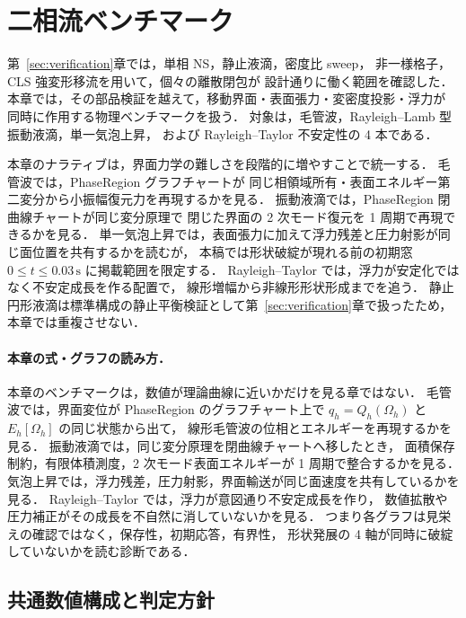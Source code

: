 %
%

\section{二相流ベンチマーク}
\label{sec:validation}
\label{sec:benchmarks}

第~\ref{sec:verification}章では，単相 NS，静止液滴，密度比 sweep，
非一様格子，CLS 強変形移流を用いて，個々の離散閉包が
設計通りに働く範囲を確認した．
本章では，その部品検証を越えて，移動界面・表面張力・変密度投影・浮力が
同時に作用する物理ベンチマークを扱う．
対象は，毛管波，Rayleigh--Lamb 型振動液滴，単一気泡上昇，
および Rayleigh--Taylor 不安定性の 4 本である．

本章のナラティブは，界面力学の難しさを段階的に増やすことで統一する．
毛管波では，PhaseRegion グラフチャートが
同じ相領域所有・表面エネルギー第二変分から小振幅復元力を再現するかを見る．
振動液滴では，PhaseRegion 閉曲線チャートが同じ変分原理で
閉じた界面の 2 次モード復元を 1 周期で再現できるかを見る．
単一気泡上昇では，表面張力に加えて浮力残差と圧力射影が同じ面位置を共有するかを読むが，
本稿では形状破綻が現れる前の初期窓 $0\le t\le0.03\,\mathrm{s}$ に掲載範囲を限定する．
Rayleigh--Taylor では，浮力が安定化ではなく不安定成長を作る配置で，
線形増幅から非線形形状形成までを追う．
静止円形液滴は標準構成の静止平衡検証として第~\ref{sec:verification}章で扱ったため，
本章では重複させない．

\paragraph{本章の式・グラフの読み方．}
本章のベンチマークは，数値が理論曲線に近いかだけを見る章ではない．
毛管波では，界面変位が PhaseRegion のグラフチャート上で
$q_h=Q_h(\Omega_h)$ と $E_h[\Omega_h]$ の同じ状態から出て，
線形毛管波の位相とエネルギーを再現するかを見る．
振動液滴では，同じ変分原理を閉曲線チャートへ移したとき，
面積保存制約，有限体積測度，2 次モード表面エネルギーが
1 周期で整合するかを見る．
気泡上昇では，浮力残差，圧力射影，界面輸送が同じ面速度を共有しているかを見る．
Rayleigh--Taylor では，浮力が意図通り不安定成長を作り，
数値拡散や圧力補正がその成長を不自然に消していないかを見る．
つまり各グラフは見栄えの確認ではなく，保存性，初期応答，有界性，
形状発展の 4 軸が同時に破綻していないかを読む診断である．

\subsection{共通数値構成と判定方針}
\label{sec:val_grid_policy}

